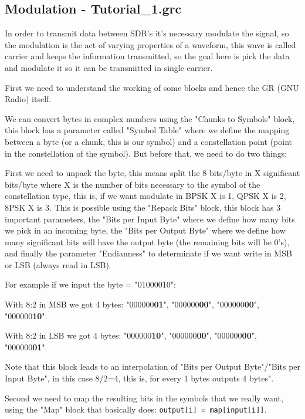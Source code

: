 \documentclass[a4paper, 10pt, conference]{ieeeconf}      %
\begin{document}
\subsection{Modulation - Tutorial\_1.grc}
    In order to transmit data between SDR's it's necessary modulate the signal, so the modulation is the act of varying properties of a waveform, this wave is called carrier and keeps the information transmitted, so the goal here is pick the data and modulate it so it can be transmitted in single carrier.
    
    First we need to understand the working of some blocks and hence the GR (GNU Radio) itself. 
    
    
    We can convert bytes in complex numbers using the "Chunks to Symbols" block, this block has a parameter called "Symbol Table" where we define the mapping between a byte (or a chunk, this is our symbol) and a constellation point (point in the constellation of the symbol). But before that, we need to do two things:
        
        First we need to unpack the byte, this means split the 8 bits/byte in X significant bits/byte where X is the number of bits necessary to the symbol of the constellation type, this is, if we want modulate in BPSK X is 1, QPSK X is 2, 8PSK X is 3.
        This is possible using the "Repack Bits" block, this block has 3 important parameters, the "Bits per Input Byte" where we define how many bits we pick in an incoming byte, the "Bits per Output Byte" where we define how many significant bits will have the output byte (the remaining bits will be 0's), and finally the parameter "Endianness" to determinate if we want write in MSB or LSB (always read in LSB). 
    
    For example if we input the byte = "01000010":
    
    With 8:2 in MSB we got 4 bytes: "000000\textbf{01}", "000000\textbf{00}", "000000\textbf{00}", "000000\textbf{10}".
    
    With 8:2 in LSB we got 4 bytes: "000000\textbf{10}", "000000\textbf{00}", "000000\textbf{00}", "000000\textbf{01}".
    
    Note that this block leads to an interpolation of "Bits per Output Byte"/"Bits per Input Byte", in this case 8/2=4, this is, for every 1 bytes outputs 4 bytes". 
        
        Second we need to map the resulting bits in the symbols that we really want, using the "Map" block that basically does: \verb|output[i] = map[input[i]]|.
    
\end{document}
